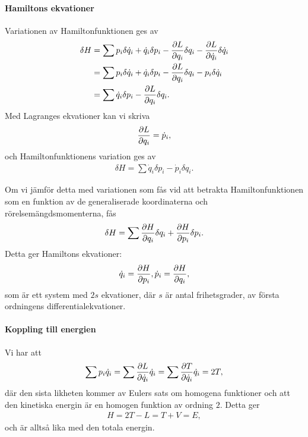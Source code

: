 \paragraph{Hamiltons ekvationer}
Variationen av Hamiltonfunktionen ges av
\begin{align*}
	\delta H &= \sum p_{i}\delta\dot{q}_{i} + \dot{q}_{i}\delta p_{i} - \pdv{L}{q_{i}}\delta q_{i} - \pdv{L}{\dot{q}_{i}}\delta\dot{q}_{i} \\
	         &= \sum p_{i}\delta\dot{q}_{i} + \dot{q}_{i}\delta p_{i} - \pdv{L}{q_{i}}\delta q_{i} - p_{i}\delta\dot{q}_{i} \\
	         &= \sum\dot{q}_{i}\delta p_{i} - \pdv{L}{q_{i}}\delta q_{i}.
\end{align*}
Med Lagranges ekvationer kan vi skriva
\begin{align*}
	\pdv{L}{q_{i}} = \dot{p}_{i},
\end{align*}
och Hamiltonfunktionens variation ges av
\begin{align*}
	\delta H = \sum\dot{q}_{i}\delta p_{i} - \dot{p}_{i}\delta q_{i}.
\end{align*}

Om vi jämför detta med variationen som fås vid att betrakta Hamiltonfunktionen som en funktion av de generaliserade koordinaterna och rörelsemängdsmomenterna, fås
\begin{align*}
	\delta H = \sum\pdv{H}{q_{i}}\delta q_{i} + \pdv{H}{p_{i}}\delta p_{i}.
\end{align*}
Detta ger Hamiltons ekvationer:
\begin{align*}
	\dot{q}_{i} = \pdv{H}{p_{i}}, \dot{p}_{i} = \pdv{H}{q_{i}},
\end{align*}
som är ett system med $2s$ ekvationer, där $s$ är antal frihetsgrader, av första ordningens differentialekvationer.

\paragraph{Koppling till energien}
Vi har att
\begin{align*}
	\sum p_{i}\dot{q}_{i} = \sum\pdv{L}{\dot{q}_{i}}\dot{q}_{i} = \sum\pdv{T}{\dot{q}_{i}}\dot{q}_{i} = 2T,
\end{align*}
där den sista likheten kommer av Eulers sats om homogena funktioner och att den kinetiska energin är en homogen funktion av ordning $2$. Detta ger
\begin{align*}
	H = 2T - L = T + V = E,
\end{align*}
och är alltså lika med den totala energin.